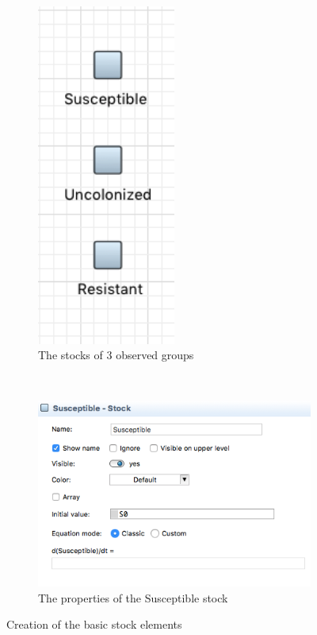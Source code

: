 \begin{figure}[H]
    \centering
    \begin{subfigure}[b]{0.3\textwidth}
        \includegraphics[width=0.5\textwidth]{img/screens/basic/basic4}
        \caption{The stocks of 3 observed groups}
    \end{subfigure}
    ~ %
    \begin{subfigure}[b]{0.6\textwidth}
        \includegraphics[width=\textwidth]{img/screens/basic/basic3}
        \caption{The properties of the Susceptible stock}
    \end{subfigure}
    \caption{Creation of the basic stock elements}
\end{figure}

